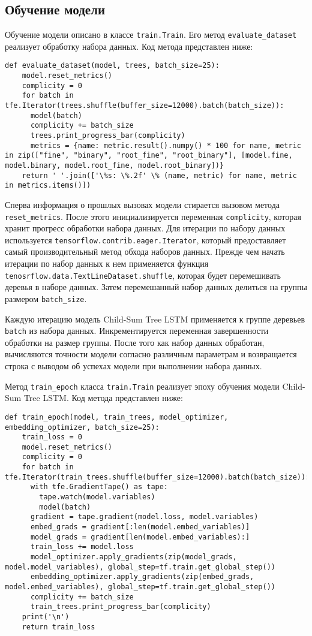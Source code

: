 \subsection{Обучение модели}
Обучение модели описано в классе \texttt{train.Train}. Его метод \texttt{eva\-lua\-te\_dataset} реализует обработку набора данных. Код метода представлен ниже:
\medskip
\begin{lstlisting}[style=Python]
  def evaluate_dataset(model, trees, batch_size=25):
    model.reset_metrics()
    complicity = 0
    for batch in tfe.Iterator(trees.shuffle(buffer_size=12000).batch(batch_size)):
      model(batch)
      complicity += batch_size
      trees.print_progress_bar(complicity)
      metrics = {name: metric.result().numpy() * 100 for name, metric in zip(["fine", "binary", "root_fine", "root_binary"], [model.fine, model.binary, model.root_fine, model.root_binary])}
    return ' '.join(['\%s: \%.2f' \% (name, metric) for name, metric in metrics.items()])
\end{lstlisting}
\medskip

Сперва информация о прошлых вызовах модели стирается вызовом метода \texttt{reset\_metrics}. После этого инициализируется переменная \texttt{complicity}, которая хранит прогресс обработки набора данных. Для итерации по набору данных используется \texttt{tensorflow.contrib.eager.Iterator}, который предоставляет самый производительный метод обхода наборов данных. Прежде чем начать итерации по набор данных к нем применяется функция \texttt{tenosr\-flow.data.TextLineDataset.shuffle}, которая будет перемешивать деревья в наборе данных. Затем перемешанный набор данных делиться на группы размером \texttt{batch\_size}.

Каждую итерацию модель Child-Sum Tree LSTM применяется к группе деревьев \texttt{batch} из набора данных. Инкрементируется переменная завершенности обработки на размер группы. После того как набор данных обработан, вычисляются точности модели согласно различным параметрам и возвращается строка с выводом об успехах модели при выполнении набора данных.

Метод \texttt{train\_epoch} класса \texttt{train.Train} реализует эпоху обучения модели Child-Sum Tree LSTM\@. Код метода представлен ниже:
\medskip
\begin{lstlisting}[style=Python]
  def train_epoch(model, train_trees, model_optimizer, embedding_optimizer, batch_size=25):
    train_loss = 0
    model.reset_metrics()
    complicity = 0
    for batch in tfe.Iterator(train_trees.shuffle(buffer_size=12000).batch(batch_size)):
      with tfe.GradientTape() as tape:
        tape.watch(model.variables)
        model(batch)
      gradient = tape.gradient(model.loss, model.variables)
      embed_grads = gradient[:len(model.embed_variables)]
      model_grads = gradient[len(model.embed_variables):]
      train_loss += model.loss
      model_optimizer.apply_gradients(zip(model_grads, model.model_variables), global_step=tf.train.get_global_step())
      embedding_optimizer.apply_gradients(zip(embed_grads, model.embed_variables), global_step=tf.train.get_global_step())
      complicity += batch_size
      train_trees.print_progress_bar(complicity)
    print('\n')
    return train_loss
\end{lstlisting}
\medskip

